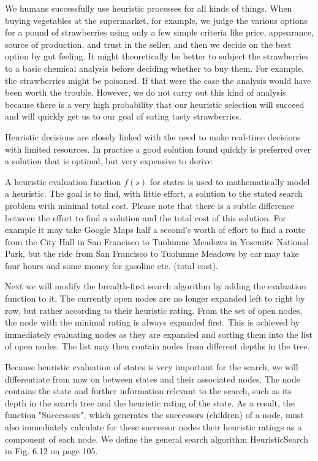 \documentclass[10pt]{article}
\begin{document}
We humans successfully use heuristic processes for all kinds of things. When buying vegetables at the supermarket, for example, we judge the various options for a pound of strawberries using only a few simple criteria like price, appearance, source of production, and trust in the seller, and then we decide on the best option by gut feeling. It might theoretically be better to subject the strawberries to a basic chemical analysis before deciding whether to buy them. For example, the strawberries might be poisoned. If that were the case the analysis would have been worth the trouble. However, we do not carry out this kind of analysis because there is a very high probability that our heuristic selection will succeed and will quickly get us to our goal of eating tasty strawberries.

Heuristic decisions are closely linked with the need to make real-time decisions with limited resources. In practice a good solution found quickly is preferred over a solution that is optimal, but very expensive to derive.

A heuristic evaluation function $f(s)$ for states is used to mathematically model a heuristic. The goal is to find, with little effort, a solution to the stated search problem with minimal total cost. Please note that there is a subtle difference between the effort to find a solution and the total cost of this solution. For example it may take Google Maps half a second's worth of effort to find a route from the City Hall in San Francisco to Tuolumne Meadows in Yosemite National Park, but the ride from San Francisco to Tuolumne Meadows by car may take four hours and some money for gasoline etc. (total cost).

Next we will modify the breadth-first search algorithm by adding the evaluation function to it. The currently open nodes are no longer expanded left to right by row, but rather according to their heuristic rating. From the set of open nodes, the node with the minimal rating is always expanded first. This is achieved by immediately evaluating nodes as they are expanded and sorting them into the list of open nodes. The list may then contain nodes from different depths in the tree.

Because heuristic evaluation of states is very important for the search, we will differentiate from now on between states and their associated nodes. The node contains the state and further information relevant to the search, such as its depth in the search tree and the heuristic rating of the state. As a result, the function "Successors", which generates the successors (children) of a node, must also immediately calculate for these successor 
nodes their heuristic ratings as a component of each node. We define the general search algorithm HeuristicSearch in Fig. 6.12 on page 105.
\end{document}
